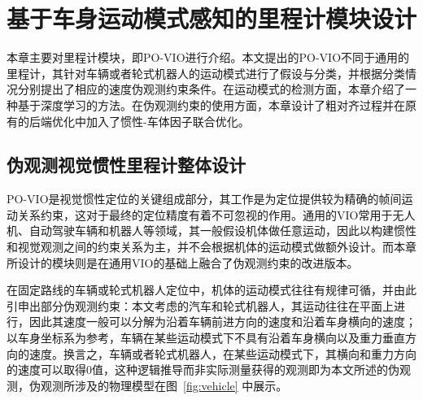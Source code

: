 
\chapter{基于车身运动模式感知的里程计模块设计}

本章主要对里程计模块，即PO-VIO进行介绍。本文提出的PO-VIO不同于通用的里程计，其针对车辆或者轮式机器人的运动模式进行了假设与分类，并根据分类情况分别提出了相应的速度伪观测约束条件。在运动模式的检测方面，本章介绍了一种基于深度学习的方法。在伪观测约束的使用方面，本章设计了粗对齐过程并在原有的后端优化中加入了惯性-车体因子联合优化。

\section{伪观测视觉惯性里程计整体设计}
PO-VIO是视觉惯性定位的关键组成部分，其工作是为定位提供较为精确的帧间运动关系约束，这对于最终的定位精度有着不可忽视的作用。通用的VIO常用于无人机、自动驾驶车辆和机器人等领域，其一般假设机体做任意运动，因此以构建惯性和视觉观测之间的约束关系为主，并不会根据机体的运动模式做额外设计。而本章所设计的模块则是在通用VIO的基础上融合了伪观测约束的改进版本。

在固定路线的车辆或轮式机器人定位中，机体的运动模式往往有规律可循，并由此引申出部分伪观测约束：本文考虑的汽车和轮式机器人，其运动往往在平面上进行，因此其速度一般可以分解为沿着车辆前进方向的速度和沿着车身横向的速度；以车身坐标系为参考，车辆在某些运动模式下不具有沿着车身横向以及重力垂直方向的速度。换言之，车辆或者轮式机器人，在某些运动模式下，其横向和重力方向的速度可以取得0值，这种逻辑推导而非实际测量获得的观测即为本文所述的伪观测，伪观测所涉及的物理模型在图~\ref{fig:vehicle} 中展示。

